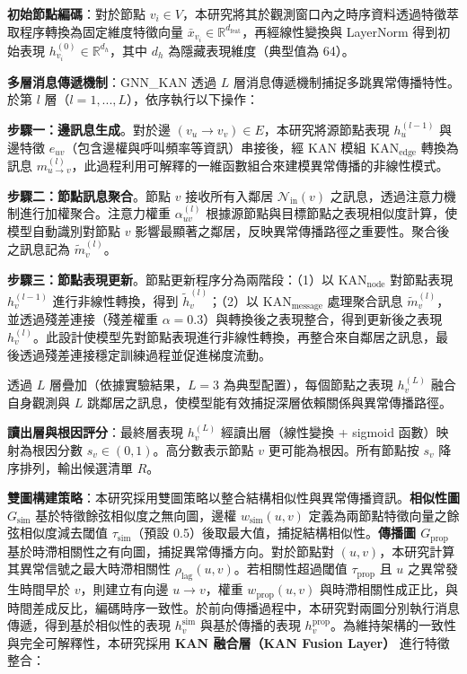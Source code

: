 \documentclass[10pt,a4paper,twocolumn]{article}
\begin{document}
\textbf{初始節點編碼}：對於節點 $v_i \in V$，本研究將其於觀測窗口內之時序資料透過特徵萃取程序轉換為固定維度特徵向量 $\bar{x}_{v_i} \in \mathbb{R}^{d_{\text{feat}}}$，再經線性變換與 LayerNorm 得到初始表現 $h_{v_i}^{(0)} \in \mathbb{R}^{d_h}$，其中 $d_h$ 為隱藏表現維度（典型值為 64）。

\textbf{多層消息傳遞機制}：GNN\_KAN 透過 $L$ 層消息傳遞機制捕捉多跳異常傳播特性。於第 $l$ 層（$l = 1, ..., L$），依序執行以下操作：

\textbf{步驟一：邊訊息生成}。對於邊 $(v_u \to v_v) \in E$，本研究將源節點表現 $h_u^{(l-1)}$ 與邊特徵 $e_{uv}$（包含邊權與呼叫頻率等資訊）串接後，經 KAN 模組 $\text{KAN}_{\text{edge}}$ 轉換為訊息 $m_{u \to v}^{(l)}$，此過程利用可解釋的一維函數組合來建模異常傳播的非線性模式。

\textbf{步驟二：節點訊息聚合}。節點 $v$ 接收所有入鄰居 $\mathcal{N}_{\text{in}}(v)$ 之訊息，透過注意力機制進行加權聚合。注意力權重 $\alpha_{uv}^{(l)}$ 根據源節點與目標節點之表現相似度計算，使模型自動識別對節點 $v$ 影響最顯著之鄰居，反映異常傳播路徑之重要性。聚合後之訊息記為 $\tilde{m}_v^{(l)}$。

\textbf{步驟三：節點表現更新}。節點更新程序分為兩階段：（1）以 $\text{KAN}_{\text{node}}$ 對節點表現 $h_v^{(l-1)}$ 進行非線性轉換，得到 $\tilde{h}_v^{(l)}$；（2）以 $\text{KAN}_{\text{message}}$ 處理聚合訊息 $\tilde{m}_v^{(l)}$，並透過殘差連接（殘差權重 $\alpha=0.3$）與轉換後之表現整合，得到更新後之表現 $h_v^{(l)}$。此設計使模型先對節點表現進行非線性轉換，再整合來自鄰居之訊息，最後透過殘差連接穩定訓練過程並促進梯度流動。

透過 $L$ 層疊加（依據實驗結果，$L=3$ 為典型配置），每個節點之表現 $h_v^{(L)}$ 融合自身觀測與 $L$ 跳鄰居之訊息，使模型能有效捕捉深層依賴關係與異常傳播路徑。

\textbf{讀出層與根因評分}：最終層表現 $h_v^{(L)}$ 經讀出層（線性變換 + sigmoid 函數）映射為根因分數 $s_v \in (0, 1)$。高分數表示節點 $v$ 更可能為根因。所有節點按 $s_v$ 降序排列，輸出候選清單 $R$。

\textbf{雙圖構建策略}：本研究採用雙圖策略以整合結構相似性與異常傳播資訊。\textbf{相似性圖 $G_{\text{sim}}$} 基於特徵餘弦相似度之無向圖，邊權 $w_{\text{sim}}(u, v)$ 定義為兩節點特徵向量之餘弦相似度減去閾值 $\tau_{\text{sim}}$（預設 0.5）後取最大值，捕捉結構相似性。\textbf{傳播圖 $G_{\text{prop}}$} 基於時滯相關性之有向圖，捕捉異常傳播方向。對於節點對 $(u, v)$，本研究計算其異常信號之最大時滯相關性 $\rho_{\text{lag}}(u, v)$。若相關性超過閾值 $\tau_{\text{prop}}$ 且 $u$ 之異常發生時間早於 $v$，則建立有向邊 $u \to v$，權重 $w_{\text{prop}}(u, v)$ 與時滯相關性成正比，與時間差成反比，編碼時序一致性。於前向傳播過程中，本研究對兩圖分別執行消息傳遞，得到基於相似性的表現 $h_v^{\text{sim}}$ 與基於傳播的表現 $h_v^{\text{prop}}$。為維持架構的一致性與完全可解釋性，本研究採用 \textbf{KAN 融合層（KAN Fusion Layer）} 進行特徵整合：
\end{document}
